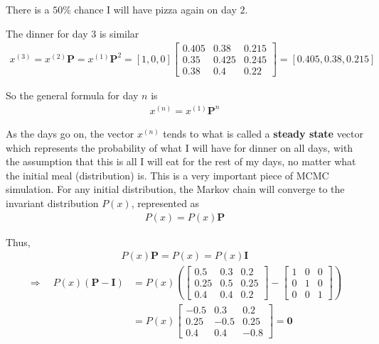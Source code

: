 \documentclass[12pt,twoside]{report}   %
\begin{document}
There is a $50\%$ chance I will have pizza again on day $2$.

The dinner for day $3$ is similar
\begin{align*}
{x}^{(3)} = {x}^{(2)}\textbf{P} = {x}^{(1)}\textbf{P}^2 = [1,0,0]\begin{bmatrix}
    0.405 & 0.38 & 0.215 \\
    0.35 & 0.425 & 0.245 \\
    0.38 & 0.4 & 0.22
\end{bmatrix} = [0.405,0.38,0.215]
\end{align*}

So the general formula for day $n$ is
\begin{align*}
{x}^{(n)} = {x}^{(1)}\textbf{P}^n
\end{align*}

As the days go on, the vector ${x}^{(n)}$ tends to what is called a \textbf{steady state} vector which represents the probability of what I will have for dinner on all days, with the assumption that this is all I will eat for the rest of my days, no matter what the initial meal (distribution) is. This is a very important piece of MCMC simulation. For any initial distribution, the Markov chain will converge to the invariant distribution $P(x)$, represented as
\begin{align}\label{Stationary Vector}
P(x) = P(x)\textbf{P}
\end{align}

Thus,
\begin{align*}
P(x)\textbf{P} = P(x) = P(x)\textbf{I}
\end{align*}
\vspace{-30pt}
\begin{align*}
\Rightarrow\quad P(x)(\textbf{P} - \textbf{I}) &= P(x)\left(\begin{bmatrix}
    0.5 & 0.3 & 0.2 \\
    0.25 & 0.5 & 0.25 \\
    0.4 & 0.4 & 0.2
\end{bmatrix} - \begin{bmatrix}
    1 & 0 & 0 \\
    0 & 1 & 0 \\
    0 & 0 & 1
\end{bmatrix}\right)\\
&= P(x)\begin{bmatrix}
    -0.5 & 0.3 & 0.2 \\
    0.25 & -0.5 & 0.25 \\
    0.4 & 0.4 & -0.8
\end{bmatrix} = \boldsymbol{0}\\
\end{align*}
\end{document}
